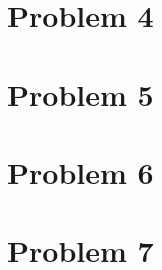 \documentclass{article}
\newcommand{\1}{\mathbf{1}}
\begin{document}
	
\newpage
\section*{Problem 4}


\newpage
\section*{Problem 5}


\newpage
\section*{Problem 6}


\newpage
\section*{Problem 7}
\end{document}
